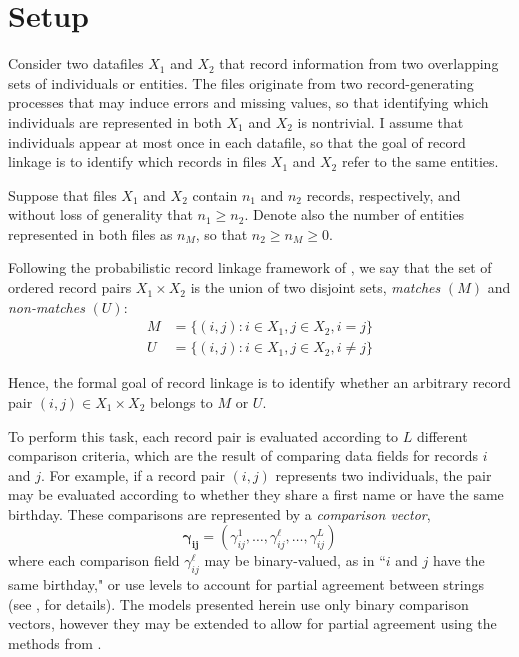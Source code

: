 \documentclass[11pt,reqno]{amsart}
\begin{document}
\section{Setup}

Consider two datafiles $X_1$ and $X_2$ that record information from two overlapping sets of individuals or entities.  The files originate from two record-generating processes that may induce errors and missing values, so that identifying which individuals are represented in both $X_1$ and $X_2$ is nontrivial.  I assume that individuals appear at most once in each datafile, so that the goal of record linkage is to identify which records in files $X_1$ and $X_2$ refer to the same entities.

Suppose that files $X_1$ and $X_2$ contain $n_1$ and $n_2$ records, respectively, and without loss of generality that $n_1 \geq n_2$.  Denote also the number of entities represented in both files as $n_{M}$, so that $n_2\geq n_M \geq 0$. 

Following the probabilistic record linkage framework of \cite{fs1969}, we say that the set of ordered record pairs $X_1 \times X_2$ is the union of two disjoint sets, \textit{matches} $(M)$ and \textit{non-matches} $(U)$:
\begin{align*} M &= \{(i,j): i\in X_1, j\in X_2, i=j\} \\ U &= \{(i,j): i\in X_1, j\in X_2, i\neq j\}\end{align*} 

Hence, the formal goal of record linkage is to identify whether an arbitrary record pair $(i,j)\in X_1\times X_2$ belongs to $M$ or $U$. 

To perform this task, each record pair is evaluated according to $L$ different comparison criteria, which are the result of comparing data fields for records $i$ and $j$.  For example, if a record pair $(i,j)$ represents two individuals, the pair may be evaluated according to whether they share a first name or have the same birthday.  These comparisons are represented by a \textit{comparison vector}, $$\mathbf{\gamma_{ij}}= (\gamma_{ij}^1, \dots, \gamma_{ij}^{\ell}, \dots, \gamma_{ij}^L)$$  where each comparison field $\gamma_{ij}^{\ell}$ may be binary-valued, as in ``$i$ and $j$ have the same birthday," or use levels to account for partial agreement between strings (see \citealp{winkler90}, for details).  The models presented herein use only binary comparison vectors, however they may be extended to allow for partial agreement using the methods from \cite{sadinle_2017}.
\end{document}
